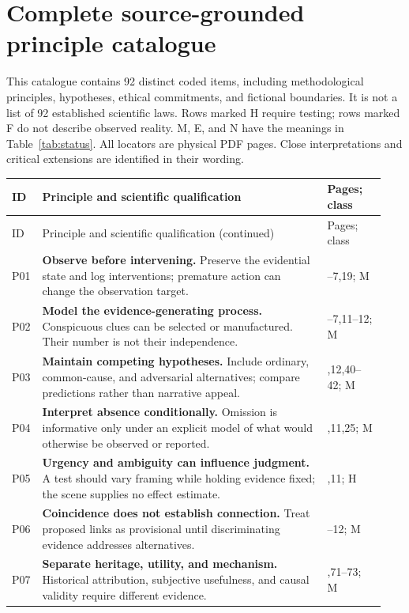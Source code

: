 \section{Complete source-grounded principle catalogue}
\label{app:catalogue}
This catalogue contains 92 distinct coded items, including methodological principles, hypotheses, ethical commitments, and fictional boundaries. It is not a list of 92 established scientific laws. Rows marked H require testing; rows marked F do not describe observed reality. M, E, and N have the meanings in Table~\ref{tab:status}. All locators are physical PDF pages. Close interpretations and critical extensions are identified in their wording.
\small
\begin{longtable}{@{}>{\raggedright\arraybackslash}p{0.055\linewidth}>{\raggedright\arraybackslash}p{0.735\linewidth}>{\raggedright\arraybackslash}p{0.15\linewidth}@{}}
\toprule
ID & Principle and scientific qualification & Pages; class\\\midrule
\endfirsthead
\toprule
ID & Principle and scientific qualification (continued) & Pages; class\\\midrule
\endhead
\bottomrule
\endfoot
P01 & \textbf{Observe before intervening.} Preserve the evidential state and log interventions; premature action can change the observation target. & 6--7,19; M\\[0.5em]
P02 & \textbf{Model the evidence-generating process.} Conspicuous clues can be selected or manufactured. Their number is not their independence. & 6--7,11--12; M\\[0.5em]
P03 & \textbf{Maintain competing hypotheses.} Include ordinary, common-cause, and adversarial alternatives; compare predictions rather than narrative appeal. & 6,12,40--42; M\\[0.5em]
P04 & \textbf{Interpret absence conditionally.} Omission is informative only under an explicit model of what would otherwise be observed or reported. & 7,11,25; M\\[0.5em]
P05 & \textbf{Urgency and ambiguity can influence judgment.} A test should vary framing while holding evidence fixed; the scene supplies no effect estimate. & 7,11; H\\[0.5em]
P06 & \textbf{Coincidence does not establish connection.} Treat proposed links as provisional until discriminating evidence addresses alternatives. & 11--12; M\\[0.5em]
P07 & \textbf{Separate heritage, utility, and mechanism.} Historical attribution, subjective usefulness, and causal validity require different evidence. & 8,71--73; M\\[0.5em]

\end{longtable}
